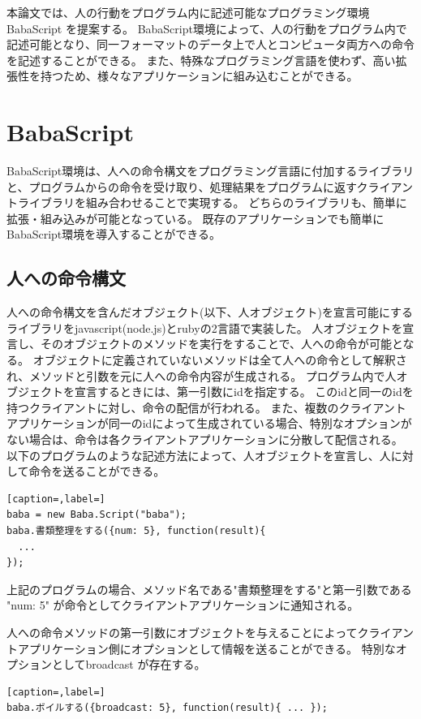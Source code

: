 \documentclass{deimj}
\begin{document}
本論文では、人の行動をプログラム内に記述可能なプログラミング環境 BabaScript を提案する。
BabaScript環境によって、人の行動をプログラム内で記述可能となり、同一フォーマットのデータ上で人とコンピュータ両方への命令を記述することができる。
また、特殊なプログラミング言語を使わず、高い拡張性を持つため、様々なアプリケーションに組み込むことができる。

\section{BabaScript}

BabaScript環境は、人への命令構文をプログラミング言語に付加するライブラリと、プログラムからの命令を受け取り、処理結果をプログラムに返すクライアントライブラリを組み合わせることで実現する。
どちらのライブラリも、簡単に拡張・組み込みが可能となっている。
既存のアプリケーションでも簡単にBabaScript環境を導入することができる。

\subsection{人への命令構文}
人への命令構文を含んだオブジェクト(以下、人オブジェクト)を宣言可能にするライブラリをjavascript(node.js)とrubyの2言語で実装した。
人オブジェクトを宣言し、そのオブジェクトのメソッドを実行をすることで、人への命令が可能となる。
オブジェクトに定義されていないメソッドは全て人への命令として解釈され、メソッドと引数を元に人への命令内容が生成される。
プログラム内で人オブジェクトを宣言するときには、第一引数にidを指定する。
このidと同一のidを持つクライアントに対し、命令の配信が行われる。
また、複数のクライアントアプリケーションが同一のidによって生成されている場合、特別なオプションがない場合は、命令は各クライアントアプリケーションに分散して配信される。
以下のプログラムのような記述方法によって、人オブジェクトを宣言し、人に対して命令を送ることができる。

\begin{lstlisting}[caption=,label=]
baba = new Baba.Script("baba");
baba.書類整理をする({num: 5}, function(result){
  ...
});
\end{lstlisting}
上記のプログラムの場合、メソッド名である"書類整理をする"と第一引数である "{num: 5}" が命令としてクライアントアプリケーションに通知される。

人への命令メソッドの第一引数にオブジェクトを与えることによってクライアントアプリケーション側にオプションとして情報を送ることができる。
特別なオプションとしてbroadcast が存在する。

\begin{lstlisting}[caption=,label=]
baba.ボイルする({broadcast: 5}, function(result){ ... });
\end{lstlisting}
\end{document}

